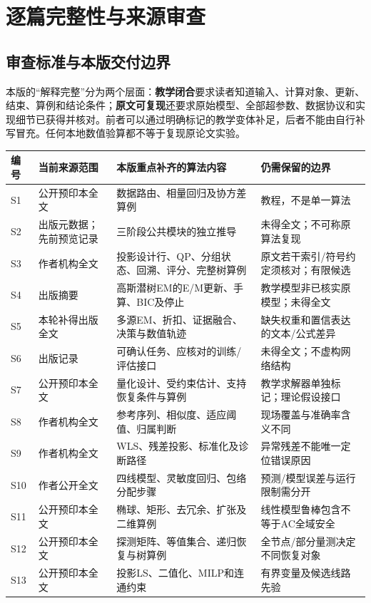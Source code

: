 \chapter{逐篇完整性与来源审查}
\label{app:audit}
\section{审查标准与本版交付边界}
本版的“解释完整”分为两个层面：\textbf{教学闭合}要求读者知道输入、计算对象、更新、结束、算例和结论条件；\textbf{原文可复现}还要求原始模型、全部超参数、数据协议和实现细节已获得并核对。前者可以通过明确标记的教学变体补足，后者不能由自行补写冒充。任何本地数值验算都不等于复现原论文实验。

\begin{longtable}{p{}p{}p{}p{}}
\toprule 编号 & 当前来源范围 & 本版重点补齐的算法内容 & 仍需保留的边界\\\midrule\endhead
S1 & 公开预印本全文 & 数据路由、相量回归及协方差算例 & 教程，不是单一算法\\
S2 & 出版元数据；先前预览记录 & 三阶段公共模块的独立推导 & 未得全文；不可称原算法复现\\
S3 & 作者机构全文 & 投影设计行、QP、分组状态、回溯、评分、完整树算例 & 原文若干索引/符号约定须核对；有限候选\\
S4 & 出版摘要 & 高斯潜树EM的E/M更新、手算、BIC及停止 & 教学模型非已核实原模型；未得全文\\
S5 & 本轮补得出版全文 & 多源EM、折扣、证据融合、决策与数值轨迹 & 缺失权重和置信表达的文本/公式差异\\
S6 & 出版记录 & 可确认任务、应核对的训练/评估接口 & 未得全文；不虚构网络结构\\
S7 & 公开预印本全文 & 量化设计、受约束估计、支持恢复条件与算例 & 教学求解器单独标记；理论假设接口\\
S8 & 作者机构全文 & 参考序列、相似度、适应阈值、归属判断 & 现场覆盖与准确率含义不同\\
S9 & 作者机构全文 & WLS、残差投影、标准化及诊断路径 & 异常残差不能唯一定位错误原因\\
S10 & 作者公开全文 & 四线模型、灵敏度回归、包络分配步骤 & 预测/模型误差与运行限制需分开\\
S11 & 公开预印本全文 & 椭球、矩形、去冗余、扩张及二维算例 & 线性模型鲁棒包含不等于AC全域安全\\
S12 & 公开预印本全文 & 探测矩阵、等值集合、递归恢复与树算例 & 全节点/部分量测决定不同恢复对象\\
S13 & 公开预印本全文 & 投影LS、二值化、MILP和连通约束 & 有界变量及候选线路先验\\

\end{longtable}
